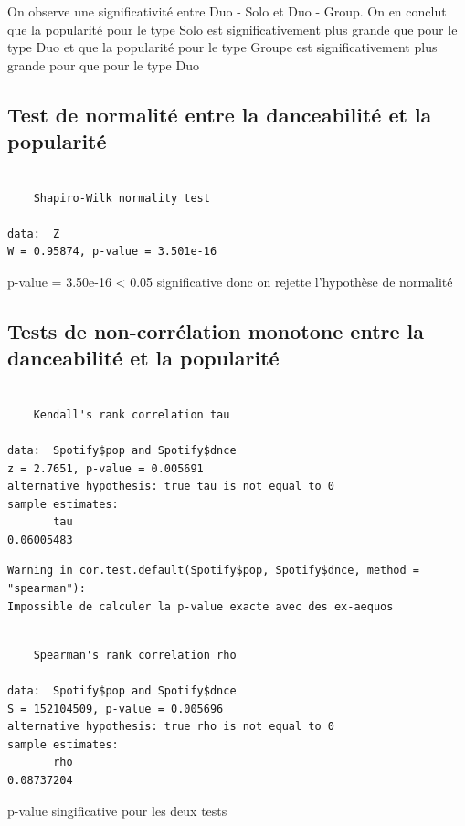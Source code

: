 \documentclass[french,]{compterendu}
\theoremstyle{urcastyle}
\theoremstyle{remark}
\begin{document}
On observe une significativité entre Duo - Solo et Duo - Group. On en conclut que la popularité pour le type Solo est significativement plus grande que pour le type Duo et que la popularité pour le type Groupe est significativement plus grande pour que pour le type Duo

\hypertarget{TestNorm2}{%
\subsection{Test de normalité entre la danceabilité et la popularité}\label{TestNorm2}}

\begin{verbatim}

    Shapiro-Wilk normality test

data:  Z
W = 0.95874, p-value = 3.501e-16
\end{verbatim}

p-value = 3.50e-16 \textless{} 0.05 significative donc on rejette l'hypothèse de normalité

\hypertarget{TestCor2}{%
\subsection{Tests de non-corrélation monotone entre la danceabilité et la popularité}\label{TestCor2}}

\begin{verbatim}

    Kendall's rank correlation tau

data:  Spotify$pop and Spotify$dnce
z = 2.7651, p-value = 0.005691
alternative hypothesis: true tau is not equal to 0
sample estimates:
       tau 
0.06005483 
\end{verbatim}

\begin{verbatim}
Warning in cor.test.default(Spotify$pop, Spotify$dnce, method = "spearman"):
Impossible de calculer la p-value exacte avec des ex-aequos
\end{verbatim}

\begin{verbatim}

    Spearman's rank correlation rho

data:  Spotify$pop and Spotify$dnce
S = 152104509, p-value = 0.005696
alternative hypothesis: true rho is not equal to 0
sample estimates:
       rho 
0.08737204 
\end{verbatim}

p-value singificative pour les deux tests
\end{document}
